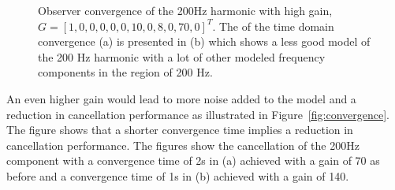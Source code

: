 \begin{figure}[h!]
  \centering %
  \qquad
  \caption{\label{fig:ph_highgain} Observer convergence of the 200Hz harmonic with high gain, $G = [1, 0, 0, 0, 0, 0, 10, 0, 8, 0, 70, 0]^T$. The \abbrFFT of the time domain convergence (a) is presented in (b) which shows a less good model of the 200 Hz harmonic with a lot of other modeled frequency components in the region of 200 Hz.}
\end{figure}

\FloatBarrier
An even higher gain would lead to more noise added to the model and a reduction in cancellation performance as illustrated in Figure~\ref{fig:convergence}. The figure shows that a shorter convergence time implies a reduction in cancellation performance. The figures show the cancellation of the 200Hz component with a convergence time of 2s in (a) achieved with a gain of 70 as before and a convergence time of 1s in (b) achieved with a gain of 140.

